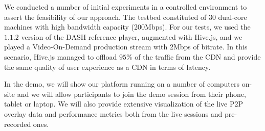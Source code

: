 \documentclass{sig-alternate}
\begin{document}





We conducted a number of initial experiments in a controlled environment to assert the
feasibility of our approach. The testbed constituted of $30$ dual-core machines with high
bandwidth capacity (200Mbps). For our tests, we used the $1.1.2$ version of the DASH
reference player, augmented with Hive.js, and we played a Video-On-Demand production
stream with 2Mbps of bitrate. In this scenario, Hive.js managed to offload $95\%$ of the
traffic from the CDN and provide the same quality of user experience as a CDN in terms of
latency.

In the demo, we will show our platform running on a number of computers on-site and we
will allow participants to join the demo session from their phone, tablet or laptop. We
will also provide extensive visualization of the live P2P overlay data and performance
metrics both from the live sessions and pre-recorded ones.
\end{document}

